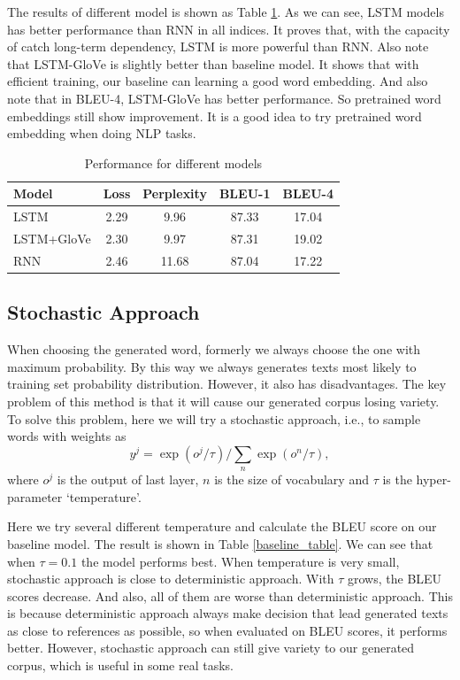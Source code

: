 \documentclass{article} %
\begin{document}
The results of different model is shown as Table \ref{bleu}. As we can see, LSTM models has better performance than RNN in all indices. It proves that, with the capacity of catch long-term dependency, LSTM is more powerful than RNN. Also note that LSTM-GloVe is slightly better than baseline model. It shows that with efficient training, our baseline can learning a good word embedding. And also note that in BLEU-4, LSTM-GloVe has better performance. So pretrained word embeddings still show improvement. It is a good idea to try pretrained word embedding when doing NLP tasks.

\begin{table}[htb!]
    \centering
    \begin{tabular}{l|c|c|c|c}
        \hline
        Model & Loss & Perplexity & BLEU-1 & BLEU-4 \\
        \hline
        LSTM & 2.29 & 9.96 & 87.33 & 17.04 \\
        \hline
        LSTM+GloVe& 2.30 & 9.97 &87.31&19.02\\\hline
        RNN & 2.46 & 11.68 & 87.04 & 17.22 \\
	    \hline
    \end{tabular}
    \caption{Performance for different models}
    \label{bleu}
\end{table}

\subsection{Stochastic Approach}

When choosing the generated word, formerly we always choose the one with maximum probability. By this way we always generates texts most likely to training set probability distribution. However, it also has disadvantages. The key problem of this method is that it will cause our generated corpus losing variety. To solve this problem, here we will try a stochastic approach, i.e., to sample words with weights as
\begin{equation}
    y^{j}=\exp \left(o^{j} / \tau\right) / \sum_{n} \exp \left(o^{n} / \tau\right),
\end{equation}
where $o^j$ is the output of last layer, $n$ is the size of vocabulary and $\tau$ is the hyper-parameter `temperature'.


Here we try several different temperature and calculate the BLEU score on our baseline model. The result is shown in Table \ref{baseline_table}. We can see that when $\tau = 0.1$ the model performs best. When temperature is very small, stochastic approach is close to deterministic approach. With $\tau$ grows, the BLEU scores decrease. And also, all of them are worse than deterministic approach. This is because deterministic approach always make decision that lead generated texts as close to references as possible, so when evaluated on BLEU scores, it performs better. However, stochastic approach can still give variety to our generated corpus, which is useful in some real tasks.
\end{document}
